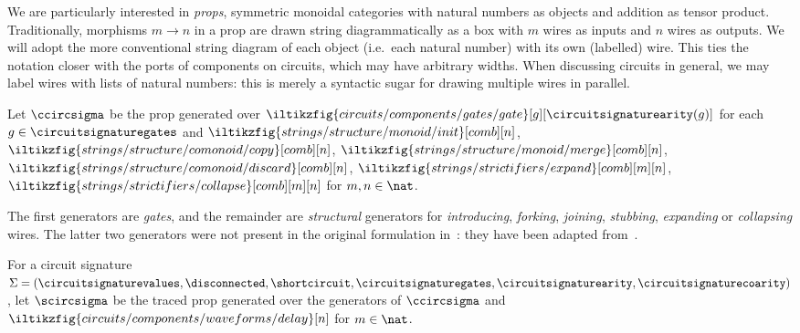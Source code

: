 We are particularly interested in \emph{props}, symmetric monoidal categories
with natural numbers as objects and addition as tensor product.
Traditionally, morphisms \(m \to n\) in a prop are drawn string diagrammatically
as a box with \(m\) wires as inputs and \(n\) wires as outputs.
We will adopt the more conventional string diagram of each object (i.e.\ each
natural number) with its own (labelled) wire.
This ties the notation closer with the ports of components on circuits,
which may have arbitrary widths.
When discussing circuits in general, we may label wires with lists of natural
numbers: this is merely a syntactic sugar for drawing multiple wires in parallel.


\begin{definition}
    Let \(\ccircsigma\) be the prop generated over \(
        \iltikzfig{circuits/components/gates/gate}[g][\circuitsignaturearity(g)]
    \) for each \(
        g \in \circuitsignaturegates
    \) and \(
        \iltikzfig{strings/structure/monoid/init}[comb][n]
    \), \(
        \iltikzfig{strings/structure/comonoid/copy}[comb][n]
    \), \(
        \iltikzfig{strings/structure/monoid/merge}[comb][n]
    \), \(
        \iltikzfig{strings/structure/comonoid/discard}[comb][n]
    \), \(
        \iltikzfig{strings/strictifiers/expand}[comb][m][n]
    \), \(
        \iltikzfig{strings/strictifiers/collapse}[comb][m][n]
    \) for \(m, n \in \nat\).
\end{definition}

The first generators are \emph{gates}, and the remainder are \emph{structural}
generators for \emph{introducing}, \emph{forking}, \emph{joining}, \emph{stubbing},
\emph{expanding} or \emph{collapsing} wires.
The latter two generators were not present in the original formulation
in~\cite{ghica2022compositional}: they have been adapted
from~\cite{wilson2022stringa}.

\begin{definition}
    For a circuit signature \(\Sigma = (
        \circuitsignaturevalues,
        \disconnected,
        \shortcircuit,
        \circuitsignaturegates,
        \circuitsignaturearity,
        \circuitsignaturecoarity
    )\), let \(\scircsigma\) be the traced prop generated
    over the generators of \(\ccircsigma\) and \(
        \iltikzfig{circuits/components/waveforms/delay}[n]
    \) for \(m \in \nat\).
\end{definition}

